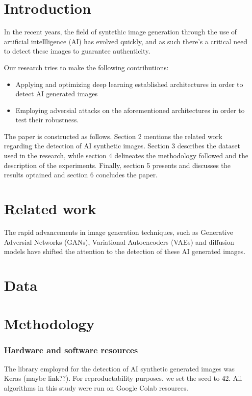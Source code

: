 \documentclass[runningheads]{llncs}
\begin{document}
\section{Introduction}

In the recent years, the field of syntethic image generation through the use of artificial intellligence (AI) has evolved quickly, and as such there's a critical need to detect these images to guarantee authenticity.


Our research tries to make the following contributions:
\begin{itemize}
    \item Applying and optimizing deep learning established architectures in order to detect AI generated images
    \item Employing adversial attacks on the aforementioned architectures in order to test their robustness.
\end{itemize}

The paper is constructed as follows. Section 2 mentions the related work regarding the detection of AI synthetic images. Section 3 describes the dataset used in the research, while section 4 delineates the methodology followed and the description of the experiments. Finally, section 5 presents and discusses the results optained and section 6 concludes the paper.

\section{Related work}

The rapid advancements in image generation techniques, such as Generative Adversial Networks (GANs), Variational Autoencoders (VAEs) and diffusion models have shifted the attention to the detection of these AI generated images.

\section{Data}
\section{Methodology}

\subsubsection{Hardware and software resources} The library employed for the detection of AI synthetic generated images was Keras (maybe link??). For reproductability purposes, we set the seed to 42. All algorithms in this study were run on Google Colab resources.
\end{document}

